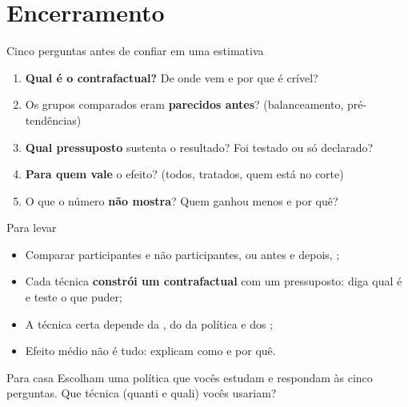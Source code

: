 \section[Fim]{Encerramento}

\begin{frame}{Cinco perguntas antes de confiar em uma estimativa}
  \begin{enumerate}
    \item \textbf{Qual é o contrafactual?} De onde vem e por que é crível?
    \item Os grupos comparados eram \textbf{parecidos antes}? (balanceamento, pré-tendências)
    \item \textbf{Qual pressuposto} sustenta o resultado? Foi testado ou só declarado?
    \item \textbf{Para quem vale} o efeito? (todos, tratados, quem está no corte)
    \item O que o número \textbf{não mostra}? Quem ganhou menos e por quê?
  \end{enumerate}
\end{frame}

\begin{frame}{Para levar}
  \begin{itemize}
    \item Comparar participantes e não participantes, ou antes e depois, ;
    \item Cada técnica \textbf{constrói um contrafactual} com um pressuposto: diga qual é e teste o que puder;
    \item A técnica certa depende da , do  da política e dos ;
    \item Efeito médio não é tudo:  explicam como e por quê.
  \end{itemize}
  \vspace{0.3cm}
  \begin{exerciciobox}{Para casa}
    \small Escolham uma política que vocês estudam e respondam às cinco perguntas. Que técnica (quanti e quali) vocês usariam?
  \end{exerciciobox}
\end{frame}

